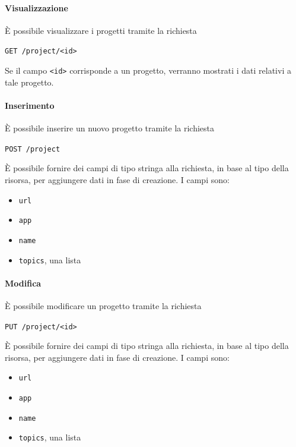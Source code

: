 \paragraph{Visualizzazione}
È possibile visualizzare i progetti tramite la richiesta
    \begin{center}
        \texttt{GET /project/<id>}
    \end{center}
Se il campo \texttt{<id>} corrisponde a un progetto, verranno mostrati i dati relativi a tale progetto.


\paragraph{Inserimento}
È possibile inserire un nuovo progetto tramite la richiesta
    \begin{center}
        \texttt{POST /project}
    \end{center}

È possibile fornire dei campi di tipo stringa alla richiesta, in base al tipo della risorsa, per aggiungere dati in fase di creazione.
I campi sono:
\begin{itemize}[noitemsep]
    \item \texttt{url}
    \item \texttt{app}
    \item \texttt{name}
    \item \texttt{topics}, una lista
\end{itemize}


\paragraph{Modifica}

È possibile modificare un progetto tramite la richiesta
\begin{center}
    \texttt{PUT /project/<id>}
\end{center}


È possibile fornire dei campi di tipo stringa alla richiesta, in base al tipo della risorsa, per aggiungere dati in fase di creazione.
I campi sono:
\begin{itemize}[noitemsep]
    \item \texttt{url}
    \item \texttt{app}
    \item \texttt{name}
    \item \texttt{topics}, una lista
\end{itemize}


